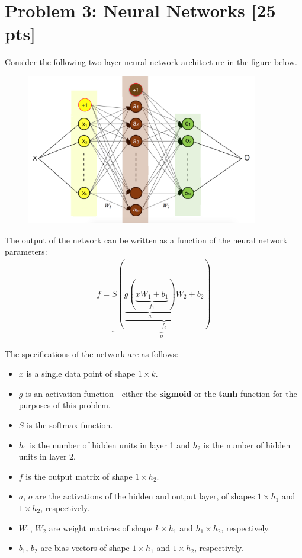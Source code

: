 \section*{Problem 3: Neural Networks [25 pts]}

Consider the following two layer neural network architecture in the figure below.
\begin{figure}[!htbp]
\begin{center}
\includegraphics[width = 0.9\textwidth]{plots/revised_nn.png}
\end{center}
\end{figure}

The output of the network can be written as a function of the neural network parameters:
\begin{align*}
	f = \underbrace{S(\underbrace{\underbrace{g(\underbrace{xW_1 + b_1}_{f_1})}_{a}W_2 + b_2}_{f_2})}_{o}
\end{align*}

The specifications of the network are as follows:
\begin{itemize}
\item $x$ is a single data point of shape $1 \times k$. 
\item $g$ is an activation function - either the \textbf{sigmoid} or the \textbf{tanh} function for the purposes of this problem.
\item $S$ is the softmax function.
\item $h_{1}$ is the number of hidden units in layer 1 and $h_{2}$ is the number of hidden units in layer 2. 
\item $f$ is the output matrix of shape $1 \times h_{2}$.
\item $a$, $o$ are the activations of the hidden and output layer, of shapes $1 \times h_1$ and $1 \times h_2$, respectively.
\item $W_{1}$, $W_{2}$ are weight matrices of shape $k \times h_{1}$ and $h_{1} \times h_{2}$,  respectively.
\item $b_{1}$, $b_{2}$ are bias vectors of shape $1 \times h_{1}$ and $1 \times h_{2}$, respectively.
\end{itemize}

